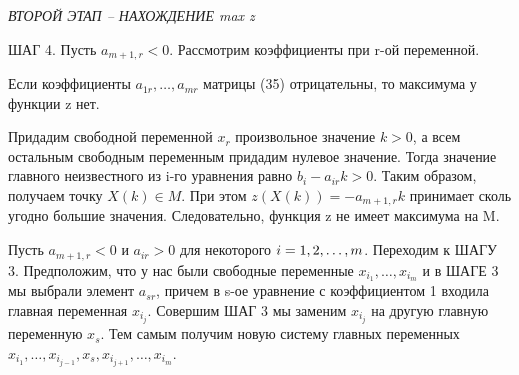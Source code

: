 


\textit{ВТОРОЙ ЭТАП – НАХОЖДЕНИЕ max z}

ШАГ 4.
Пусть $a_{m+1,r} < 0$. Рассмотрим коэффициенты при r-ой переменной.

\begin{propose}\label{cha:14/propose:3}
	Если коэффициенты $a_{1r}, \dots, a_{mr}$ матрицы (35) отрицательны, то максимума у функции z нет.
\end{propose}
\begin{Proof}
	Придадим свободной переменной $x_r$ произвольное значение $k > 0$, а всем остальным свободным переменным придадим нулевое значение. Тогда значение главного неизвестного из i-го уравнения равно $b_i − a_{ir}k > 0$. Таким образом, получаем точку $X(k) \in M$. При этом $z(X(k)) = −a_{m+1,r}k$ принимает сколь угодно большие значения. Следовательно, функция z не имеет максимума на M.
\end{Proof}

Пусть $a_{m+1,r} < 0$ и $a_{ir} > 0$ для некоторого $i=1,2,\dots,m$. Переходим к ШАГУ 3. Предположим, что у нас были свободные переменные $x_{i_1}, \dots, x_{i_m}$ и в ШАГЕ 3 мы выбрали элемент $a_{sr}$, причем в s-ое уравнение с коэффициентом 1 входила главная переменная $x_{i_j}$. Совершим ШАГ 3 мы заменим $x_{i_j}$ на другую главную переменную $x_s$. Тем самым получим новую систему главных переменных $x_{i_1}, \dots, x_{i_{j−1}}, x_s, x_{i_{j+1}}, \dots, x_{i_m}$.

